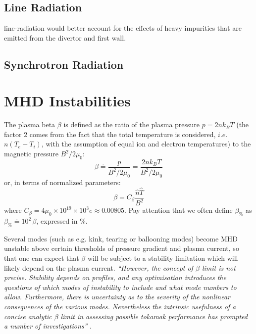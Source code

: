 \subsection{Line Radiation}
line-radiation would better account for the effects of heavy impurities that are emitted from the divertor and first wall.


\subsection{Synchrotron Radiation}



\section{MHD Instabilities}
The plasma beta $\beta$ is defined as the ratio of the plasma pressure $p=2nk_BT$ (the factor 2 comes from the fact that the total temperature is considered, $i.e.$ $n(T_e+T_i)$, with the assumption of equal ion and electron temperatures) to the magnetic pressure $B^2/2\mu_0$:
\begin{equation}
	\beta
	\doteq 
	\frac{p}{B^2/2\mu_0}
	=
	\frac{2 n k_B T}{B^2/2\mu_0}
\end{equation}
or, in terms of normalized parameters:
\begin{equation}
	\beta
	=
	C_\beta \frac{\hat n \hat T}{B^2}
\label{eqn:beta_adv}
\end{equation}
where $C_\beta = 4\mu_0\times 10^{19}\times 10^3 e \approx 0.00805$. Pay attention that we often define $\beta_\%$ as $\beta_\% \doteq 10^2\, \beta$,  expressed in $\%$.


Several modes (such as e.g. kink, tearing or ballooning modes) become MHD unstable above certain thresholds of pressure gradient and plasma current, so that one can expect that $\beta$ will be subject to a stability limitation which will likely depend on the plasma current. \emph{``However, the concept of $\beta$ limit is not precise. Stability depends on profiles, and any optimisation introduces the questions of which modes of instability to include and what mode numbers to allow. Furthermore, there is uncertainty as to the severity of the nonlinear consequences of the various modes. Nevertheless the intrinsic usefulness of a concise analytic $\beta$ limit in assessing possible tokamak performance has prompted a number of investigations''} .

